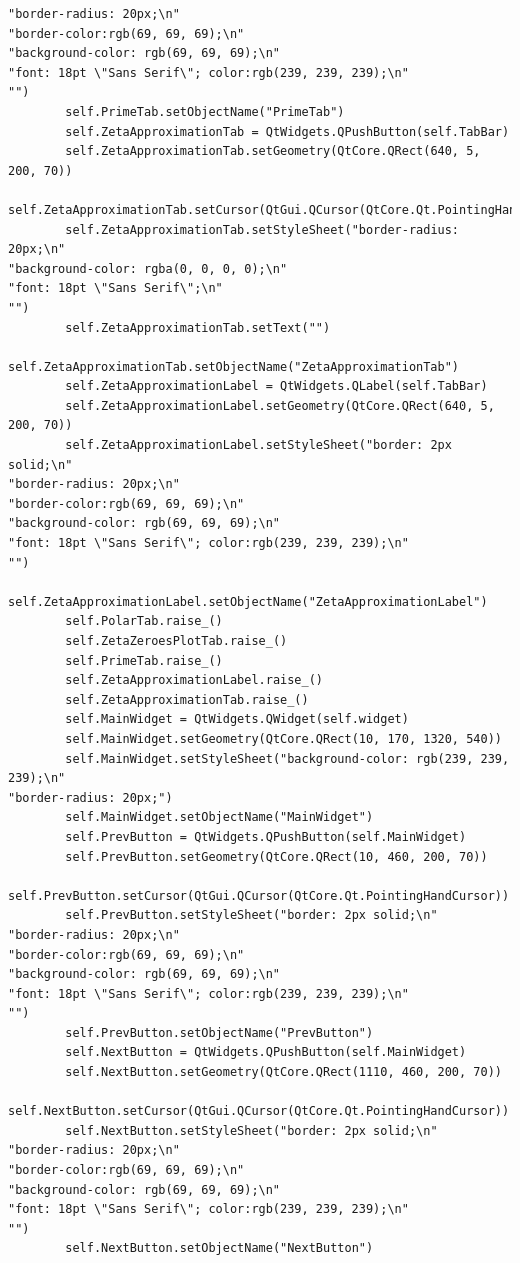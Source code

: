 \documentclass[12pt]{article}
\begin{document}
\begin{lstlisting}
"border-radius: 20px;\n"
"border-color:rgb(69, 69, 69);\n"
"background-color: rgb(69, 69, 69);\n"
"font: 18pt \"Sans Serif\"; color:rgb(239, 239, 239);\n"
"")
        self.PrimeTab.setObjectName("PrimeTab")
        self.ZetaApproximationTab = QtWidgets.QPushButton(self.TabBar)
        self.ZetaApproximationTab.setGeometry(QtCore.QRect(640, 5, 200, 70))
        self.ZetaApproximationTab.setCursor(QtGui.QCursor(QtCore.Qt.PointingHandCursor))
        self.ZetaApproximationTab.setStyleSheet("border-radius: 20px;\n"
"background-color: rgba(0, 0, 0, 0);\n"
"font: 18pt \"Sans Serif\";\n"
"")
        self.ZetaApproximationTab.setText("")
        self.ZetaApproximationTab.setObjectName("ZetaApproximationTab")
        self.ZetaApproximationLabel = QtWidgets.QLabel(self.TabBar)
        self.ZetaApproximationLabel.setGeometry(QtCore.QRect(640, 5, 200, 70))
        self.ZetaApproximationLabel.setStyleSheet("border: 2px solid;\n"
"border-radius: 20px;\n"
"border-color:rgb(69, 69, 69);\n"
"background-color: rgb(69, 69, 69);\n"
"font: 18pt \"Sans Serif\"; color:rgb(239, 239, 239);\n"
"")
        self.ZetaApproximationLabel.setObjectName("ZetaApproximationLabel")
        self.PolarTab.raise_()
        self.ZetaZeroesPlotTab.raise_()
        self.PrimeTab.raise_()
        self.ZetaApproximationLabel.raise_()
        self.ZetaApproximationTab.raise_()
        self.MainWidget = QtWidgets.QWidget(self.widget)
        self.MainWidget.setGeometry(QtCore.QRect(10, 170, 1320, 540))
        self.MainWidget.setStyleSheet("background-color: rgb(239, 239, 239);\n"
"border-radius: 20px;")
        self.MainWidget.setObjectName("MainWidget")
        self.PrevButton = QtWidgets.QPushButton(self.MainWidget)
        self.PrevButton.setGeometry(QtCore.QRect(10, 460, 200, 70))
        self.PrevButton.setCursor(QtGui.QCursor(QtCore.Qt.PointingHandCursor))
        self.PrevButton.setStyleSheet("border: 2px solid;\n"
"border-radius: 20px;\n"
"border-color:rgb(69, 69, 69);\n"
"background-color: rgb(69, 69, 69);\n"
"font: 18pt \"Sans Serif\"; color:rgb(239, 239, 239);\n"
"")
        self.PrevButton.setObjectName("PrevButton")
        self.NextButton = QtWidgets.QPushButton(self.MainWidget)
        self.NextButton.setGeometry(QtCore.QRect(1110, 460, 200, 70))
        self.NextButton.setCursor(QtGui.QCursor(QtCore.Qt.PointingHandCursor))
        self.NextButton.setStyleSheet("border: 2px solid;\n"
"border-radius: 20px;\n"
"border-color:rgb(69, 69, 69);\n"
"background-color: rgb(69, 69, 69);\n"
"font: 18pt \"Sans Serif\"; color:rgb(239, 239, 239);\n"
"")
        self.NextButton.setObjectName("NextButton")

\end{lstlisting}
\end{document}
